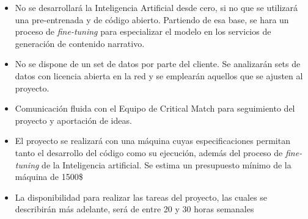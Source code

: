 \documentclass[
11pt, %
]{Clases/charter}
\begin{document}
\begin{itemize}
	\item No se desarrollará la Inteligencia Artificial desde cero, si no que se utilizará una pre-entrenada y de código abierto.
	      Partiendo de esa base, se hara un proceso de \textit{fine-tuning} para especializar el modelo en los servicios de generación de contenido narrativo.
	\item No se dispone de un set de datos por parte del cliente.
	      Se analizarán sets de datos con licencia abierta en la red y se emplearán aquellos que se ajusten al proyecto.
	\item Comunicación fluida con el Equipo de Critical Match para seguimiento del proyecto y aportación de ideas.
	\item El proyecto se realizará con una máquina cuyas especificaciones permitan tanto el desarrollo del código como su ejecución, además del proceso de \textit{fine-tuning} de la Inteligencia artificial.
	      Se estima un presupuesto mínimo de la máquina de 1500\$
	\item La disponibilidad para realizar las tareas del proyecto, las cuales se describirán más adelante, será de entre 20 y 30 horas semanales
\end{itemize}
\end{document}
